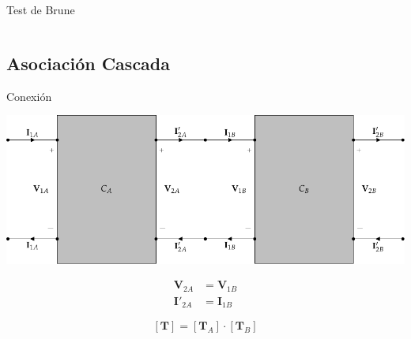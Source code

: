 \documentclass[xcolor={usenames,svgnames,dvipsnames}]{beamer}
\begin{document}
\begin{frame}[label={sec:org75273b2},plain]{Test de Brune}
\begin{columns}
\begin{column}{0.65\columnwidth}
\begin{center}
\end{center}
\end{column}
\end{columns}
\end{frame}
\subsection{Asociación Cascada}
\label{sec:orgf91c588}

\begin{frame}[label={sec:orgef71508}]{Conexión}
\begin{center}
\includegraphics[width=.9\linewidth]{../figs/cascada.pdf}
\end{center}

\begin{align*}
  \mathbf{V}_{2A} &= \mathbf{V}_{1B}\\
  \mathbf{I}'_{2A} &= \mathbf{I}_{1B}
\end{align*}


\[
  \boxed{[\mathbf{T}] = [\mathbf{T}_A] \cdot [\mathbf{T}_B]}
\]
\end{frame}
\end{document}
